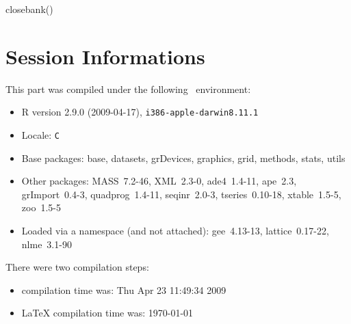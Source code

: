 \documentclass{article}
\begin{document}
\begin{Schunk}
\begin{Sinput}
 closebank()
\end{Sinput}
\end{Schunk}


\section*{Session Informations}

\begin{scriptsize}

This part was compiled under the following \Rlogo{}~environment:

\begin{itemize}
  \item R version 2.9.0 (2009-04-17), \verb|i386-apple-darwin8.11.1|
  \item Locale: \verb|C|
  \item Base packages: base, datasets, grDevices, graphics, grid,
    methods, stats, utils
  \item Other packages: MASS~7.2-46, XML~2.3-0, ade4~1.4-11,
    ape~2.3, grImport~0.4-3, quadprog~1.4-11, seqinr~2.0-3,
    tseries~0.10-18, xtable~1.5-5, zoo~1.5-5
  \item Loaded via a namespace (and not attached): gee~4.13-13,
    lattice~0.17-22, nlme~3.1-90
\end{itemize}
There were two compilation steps:

\begin{itemize}
  \item \Rlogo{} compilation time was: Thu Apr 23 11:49:34 2009
  \item \LaTeX{} compilation time was: \today
\end{itemize}

\end{scriptsize}


\clearpage
{}


\end{document}
